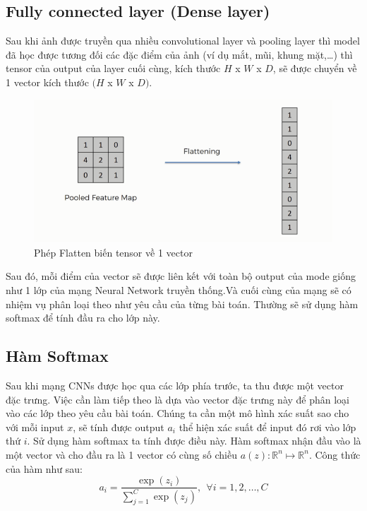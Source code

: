 \subsection{Fully connected layer (Dense layer)}
\label{ss:dense}
Sau khi ảnh được truyền qua nhiều convolutional layer và pooling layer thì model đã học được tương đối các đặc điểm của ảnh (ví dụ mắt, mũi, khung mặt,…) thì tensor của output của layer cuối cùng, kích thước $H$ x $W$ x $D$, sẽ được chuyển về 1 vector kích thước $(H$ x $W$ x $D)$.

\FloatBarrier
\begin{figure}[htp]
\begin{center}
\includegraphics[scale=1]{chap2/c2_figs/17.png}
\end{center}
\caption{Phép Flatten biến tensor về 1 vector}
\label{fig:flatten}
\end{figure}
\FloatBarrier
Sau đó, mỗi điểm của vector sẽ được liên kết với toàn bộ output của mode giống như 1 lớp của mạng Neural Network truyền thống.Và cuối cùng của mạng sẽ có nhiệm vụ phân loại theo như yêu cầu của từng bài toán. Thường sẽ sử dụng hàm softmax để tính đầu ra cho lớp này.

\subsection{Hàm Softmax}
Sau khi mạng CNNs được học qua các lớp phía trước, ta thu được một vector đặc trưng. Việc cần làm tiếp theo là dựa vào vector đặc trưng này để phân loại vào các lớp theo yêu cầu bài toán. Chúng ta cần một mô hình xác suất sao cho với mỗi input $x$, sẽ tính được output $a_i$ thể hiện xác suất để input đó rơi vào lớp thứ $i$. Sử dụng hàm softmax ta tính được điều này. Hàm softmax nhận đầu vào là một vector và cho đầu ra là 1 vector có cùng số chiều $a(z):\mathbb{R}^n\mapsto\mathbb{R}^n$. Công thức của hàm như sau:
$$a_i = \frac{\exp(z_i)}{\sum_{j=1}^C \exp(z_j)}, ~~ \forall i = 1, 2, \dots, C$$

